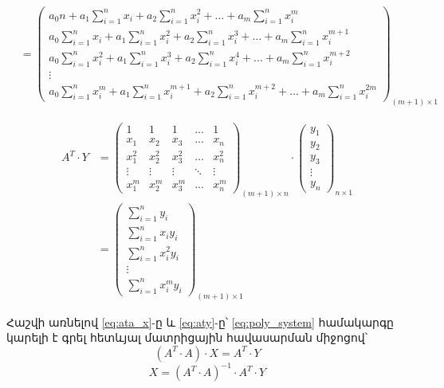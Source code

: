 \documentclass[12pt,a4paper]{article}
\numberwithin{equation}{section}
\numberwithin{figure}{section}
\begin{document}
\begin{align}
&=
\begin{pmatrix}
a_0 n + a_1 \sum_{i=1}^n x_i + a_2 \sum_{i=1}^n x_i^2 + \dots + a_m \sum_{i=1}^n x_i^m \\[6pt]
a_0 \sum_{i=1}^n x_i + a_1 \sum_{i=1}^n x_i^2 + a_2 \sum_{i=1}^n x_i^3 + \dots + a_m \sum_{i=1}^n x_i^{m+1} \\[6pt]
a_0 \sum_{i=1}^n x_i^2 + a_1 \sum_{i=1}^n x_i^3 + a_2 \sum_{i=1}^n x_i^4 + \dots + a_m \sum_{i=1}^n x_i^{m+2} \\[4pt]
\vdots \\[4pt]
a_0 \sum_{i=1}^n x_i^m + a_1 \sum_{i=1}^n x_i^{m+1} + a_2 \sum_{i=1}^n x_i^{m+2} + \dots + a_m \sum_{i=1}^n x_i^{2m}
\end{pmatrix}_{(m+1) \times 1}
\label{eq:ata_x}
\end{align}

\begin{align}
A^T \cdot Y &=
\begin{pmatrix}
1 & 1 & 1 & \dots & 1 \\
x_1 & x_2 & x_3 & \dots & x_n \\
x_1^2 & x_2^2 & x_3^2 & \dots & x_n^2 \\
\vdots & \vdots & \vdots & \ddots & \vdots \\
x_1^m & x_2^m & x_3^m & \dots & x_n^m
\end{pmatrix}_{(m+1) \times n}
\cdot
\begin{pmatrix}
y_1 \\
y_2 \\
y_3 \\
\vdots \\
y_n
\end{pmatrix}_{n \times 1} \nonumber \\[12pt]
&=
\begin{pmatrix}
\sum_{i=1}^n y_i \\[6pt]
\sum_{i=1}^n x_i y_i \\[6pt]
\sum_{i=1}^n x_i^2 y_i \\[4pt]
\vdots \\[4pt]
\sum_{i=1}^n x_i^m y_i
\end{pmatrix}_{(m+1) \times 1}
\label{eq:aty}
\end{align}

Հաշվի առնելով \eqref{eq:ata_x}-ը և \eqref{eq:aty}-ը՝ \eqref{eq:poly_system} համակարգը կարելի է գրել հետևյալ մատրիցային հավասարման միջոցով՝
\[
(A^T \cdot A) \cdot X = A^T \cdot Y
\]
\[
\boxed{X = (A^T \cdot A)^{-1} \cdot A^T \cdot Y}
\]
\end{document}
